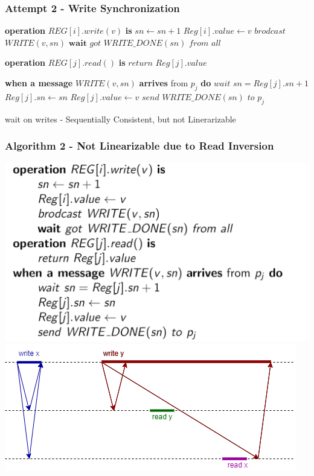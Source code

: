 \begin{frame}[fragile]
    \frametitle{Attempt 2 - Write Synchronization}
    \begin{algorithm}[H]
        \begin{algorithmic}[0]
            \STATE \textbf{operation} $REG[i].write(v)$ \textbf{is}
            \bindent
                \STATE $sn\leftarrow sn+1$
                \STATE $Reg[i].value \leftarrow v$
                \STATE $brodcast$ $WRITE(v, sn)$
                \STATE $\textbf{wait}$ $got$ $WRITE\_DONE(sn)$ $from$ $all$
            \eindent

            \STATE \textbf{operation} $REG[j].read()$ \textbf{is}
            \bindent
                \STATE $return$ $Reg[j].value$
            \eindent
            
            \STATE \textbf{when a message} $WRITE(v, sn)$ \textbf{arrives} from $p_j$ \textbf{do}
            \bindent
                \STATE $wait$ $sn = Reg[j].sn+1$
                \STATE $Reg[j].sn \leftarrow sn$
                \STATE $Reg[j].value \leftarrow v$
                \STATE $send$ $WRITE\_DONE(sn)$ $to$ $p_j$
            \eindent

        \end{algorithmic}
        \caption{wait on writes - Sequentially Consistent, but not Linerarizable}
        \label{alg:seq}
    \end{algorithm}
\end{frame}

\begin{frame}
    \frametitle{Algorithm 2 - Not Linearizable due to Read Inversion}
    \begin{center}
        \includegraphics[scale=.27]{resources/alg2_src.png}
        \includegraphics[scale=.5]{resources/alg2_incorrectness.png}
    \end{center}
\end{frame}

